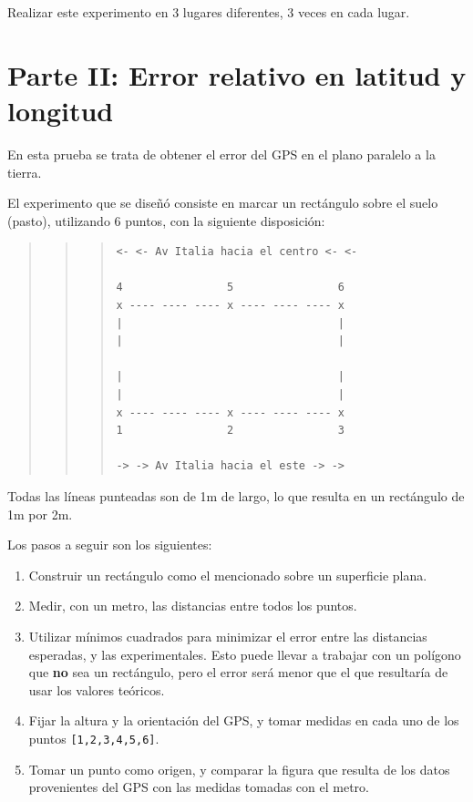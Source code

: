 \documentclass[spanish,12pt,a4paper,titlepage]{report}
\begin{document}
Realizar este experimento en 3 lugares diferentes, 3 veces en cada lugar.

\newpage
\section{Parte II: Error relativo en latitud y longitud}

En esta prueba se trata de obtener el error del GPS en el plano paralelo a la tierra.

El experimento que se diseñó consiste en marcar un rectángulo sobre el suelo (pasto), utilizando 6 puntos, con la siguiente disposición:

\begin{quote}
\begin{quote}
\begin{quote}
\begin{verbatim}
<- <- Av Italia hacia el centro <- <-

4                5                6
x ---- ---- ---- x ---- ---- ---- x
|                                 |
|                                 |

|                                 |
|                                 |
x ---- ---- ---- x ---- ---- ---- x
1                2                3

-> -> Av Italia hacia el este -> ->
\end{verbatim}
\end{quote}
\end{quote}
\end{quote}

Todas las líneas punteadas son de 1m de largo, lo que resulta en un rectángulo de 1m por 2m.

Los pasos a seguir son los siguientes:

\begin{enumerate}
\item Construir un rectángulo como el mencionado sobre un superficie plana.
\item Medir, con un metro, las distancias entre todos los puntos.
\item Utilizar mínimos cuadrados para minimizar el error entre las distancias esperadas, y las experimentales. Esto puede llevar a trabajar con un polígono que \textbf{no} sea un rectángulo, pero el error será menor que el que resultaría de usar los valores teóricos.
\item Fijar la altura y la orientación del GPS, y tomar medidas en cada uno de los puntos \verb+[1,2,3,4,5,6]+.
\item Tomar un punto como origen, y comparar la figura que resulta de los datos provenientes del GPS con las medidas tomadas con el metro.
\end{enumerate}
\end{document}
